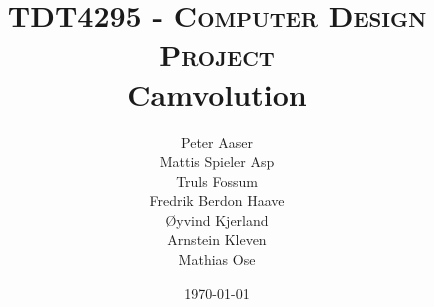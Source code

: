 
\title{
    \textsc{\Large TDT4295 - Computer Design Project}\\[0.5cm]
    {\huge \bfseries Camvolution}
}

\posttitle{
    ~\\[0.4cm]
    \HRule \\[0.4cm]
}

\author{
    Peter Aaser\\
    Mattis Spieler Asp\\
    Truls Fossum\\
    Fredrik Berdon Haave\\
    Øyvind Kjerland\\
    Arnstein Kleven\\
    Mathias Ose
}

\predate{
    \vspace{\fill}
    \begin{center}
    \large
}

\date{\today}

\postdate{
    \par
    \end{center}
}

\maketitle

